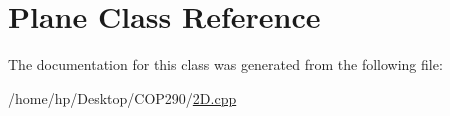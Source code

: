 \hypertarget{class_plane}{}\section{Plane Class Reference}
\label{class_plane}


The documentation for this class was generated from the following file\+:\begin{DoxyCompactItemize}
\item 
/home/hp/\+Desktop/\+C\+O\+P290/\hyperlink{2_d_8cpp}{2\+D.\+cpp}\end{DoxyCompactItemize}
